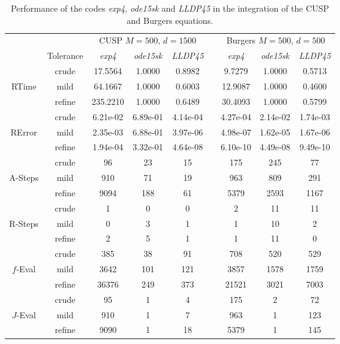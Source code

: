 \begin{table}[h]
	\caption{Performance of the codes \emph{exp4}, \emph{ode15sk} and  \emph{LLDP45} in the integration of the CUSP and Burgers equations.}
	\label{tab:num-exp-lldp-var-step:cuspburg}
	\begin{adjustbox}{width=0.8\columnwidth,center}
	\begin{tabular}{ ccccccccc }
		\hline
		& & \multicolumn{3}{c}{CUSP $M=500$, $d=1500$ } & & \multicolumn{3}{c}{Burgers $M=500$, $d=500$ }\\
		\cline{3-5} \cline{7-9}
		& Tolerance & \emph{exp4} & \emph{ode15sk} & \emph{LLDP45} & & \emph{exp4} & \emph{ode15sk} & \emph{LLDP45} \\
		\hline
		& crude & 17.5564 & 1.0000 & 0.8982 & & 9.7279 & 1.0000 & 0.5713 \\
		RTime  & mild & 64.1667 & 1.0000 & 0.6003 & & 12.9087 & 1.0000 & 0.4600 \\
		& refine & 235.2210 & 1.0000 & 0.6489 & & 30.4093 & 1.0000 & 0.5799 \\
		\hline
		& crude & 6.21e-02 & 6.89e-01 & 4.14e-04 & & 4.27e-04 & 2.14e-02 & 1.74e-03 \\
		RError  & mild & 2.35e-03 & 6.88e-01 & 3.97e-06 & & 4.98e-07 & 1.62e-05 & 1.67e-06 \\
		& refine & 1.94e-04 & 3.32e-01 & 4.64e-08 & & 6.10e-10 & 4.49e-08 & 9.49e-10  \\
		\hline
		& crude & 96 & 23 & 15 & & 175 & 245 & 77 \\
		A-Steps  & mild & 910 & 71 & 19 & &  963 & 809 & 291 \\
		& refine & 9094 & 188 & 61  & & 5379 & 2593 & 1167 \\
		\hline
		& crude & 1 & 0 & 0  & & 2 & 11 & 11 \\
		R-Steps  & mild & 0 & 3 & 1  & & 1 & 10 & 2 \\
		& refine & 2 & 5 & 1  & & 1 & 11 & 0 \\
		\hline
		& crude & 385 & 38 & 91  & & 708 & 520 & 529 \\
		$f$-Eval  & mild & 3642 & 101 & 121  & & 3857 & 1578 & 1759 \\
		& refine & 36376 & 249 & 373  & & 21521 & 3021 & 7003 \\
		\hline
		& crude & 95 & 1 & 4 &  & 175 & 2 & 72 \\
		$J$-Eval  & mild & 910 & 1 & 7 & &  963 & 1 & 123 \\
		& refine & 9090 & 1 & 18 & &  5379 & 1 & 145 \\

\end{tabular}
\end{adjustbox}
\end{table}
